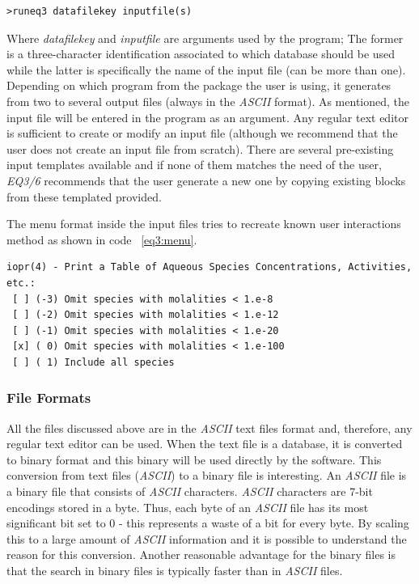 \documentclass[ppgc,mestrado,English]{iiufrgs}
\begin{document}
\begin{lstlisting}[frame=single, caption=Running EQ3 in \emph{EQ3/6} package, label=eq3:run]
>runeq3 datafilekey inputfile(s)
\end{lstlisting}

Where \emph{datafilekey} and \emph{inputfile} are arguments used by the program; The former is a three-character identification associated to which database should be used while the latter is specifically the name of the input file (can be more than one). Depending on which program from the package the user is using, it generates from two to several output files (always in the \emph{ASCII} format).
As mentioned, the input file will be entered in the program as an argument. Any regular text editor is sufficient to create or modify an input file (although we recommend that the user does not create an input file from scratch). There are several pre-existing input templates available and if none of them matches the need of the user, \emph{EQ3/6} recommends that the user generate a new one by copying existing blocks from these templated provided.

The menu format inside the input files tries to recreate known user interactions method as shown in code ~\ref{eq3:menu}.

\begin{minipage}[c]{0.93\textwidth}
\begin{lstlisting}[frame=single, caption=Menu Option inside \emph{EQ3/6} input files that mimics a "radio button", label=eq3:menu]
iopr(4) - Print a Table of Aqueous Species Concentrations, Activities, etc.: 
 [ ] (-3) Omit species with molalities < 1.e-8 
 [ ] (-2) Omit species with molalities < 1.e-12 
 [ ] (-1) Omit species with molalities < 1.e-20 
 [x] ( 0) Omit species with molalities < 1.e-100 
 [ ] ( 1) Include all species 
\end{lstlisting}
\end{minipage}


\subsubsection{File Formats}
All the files discussed above are in the \emph{ASCII} text files format and, therefore, any regular text editor can be used. When the text file is a database, it is converted to binary format and this binary will be used directly by the software. This conversion from text files (\emph{ASCII}) to a binary file is interesting. An \emph{ASCII} file is a binary file that consists of \emph{ASCII} characters. \emph{ASCII} characters are 7-bit encodings stored in a byte. Thus, each byte of an \emph{ASCII} file has its most significant bit set to 0 - this represents a waste of a bit for every byte. By scaling this to a large amount of \emph{ASCII} information and it is possible to understand the reason for this conversion. Another reasonable advantage for the binary files is that the search in binary files is typically faster than in \emph{ASCII} files.
\end{document}
